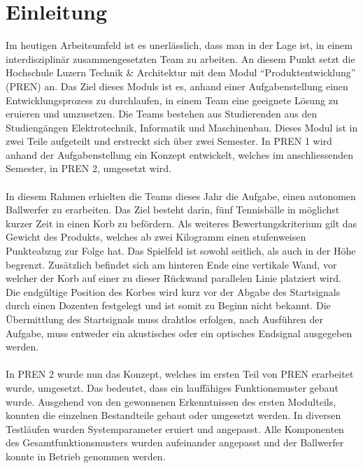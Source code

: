\section{Einleitung}
Im heutigen Arbeitsumfeld ist es unerlässlich, dass man in der Lage ist, in 
einem interdisziplinär zusammengesetzten Team zu arbeiten. An diesem Punkt 
setzt die Hochschule Luzern Technik \& Architektur mit dem Modul 
\enquote{Produktentwicklung} (PREN) an. Das Ziel dieses Moduls ist es, anhand 
einer Aufgabenstellung einen Entwicklungsprozess zu durchlaufen, in einem 
Team eine geeignete Lösung zu eruieren und umzusetzen. Die Teams bestehen 
aus Studierenden aus den Studiengängen Elektrotechnik, Informatik und 
Maschinenbau. Dieses Modul ist in zwei Teile aufgeteilt und erstreckt sich 
über zwei Semester. In PREN 1 wird anhand der Aufgabenstellung ein Konzept 
entwickelt, welches im anschliessenden Semester, in PREN 2, umgesetzt wird.\\
\\
In diesem Rahmen erhielten die Teams dieses Jahr die Aufgabe, einen autonomen 
Ballwerfer zu erarbeiten. Das Ziel besteht darin, fünf Tennisbälle in möglichst 
kurzer Zeit in einen Korb zu befördern. Als weiteres Bewertungskriterium gilt 
das Gewicht des Produkts, welches ab zwei Kilogramm einen stufenweisen 
Punkteabzug zur Folge hat. Das Spielfeld ist sowohl seitlich, als auch in der 
Höhe begrenzt. Zusätzlich befindet sich am hinteren Ende eine vertikale Wand, 
vor welcher der Korb auf einer zu dieser Rückwand parallelen Linie platziert 
wird. Die endgültige Position des Korbes wird kurz vor der Abgabe des Startsignals 
durch einen Dozenten festgelegt und ist somit zu Beginn nicht bekannt. Die 
Übermittlung des Startsignals muss drahtlos erfolgen, nach Ausführen der Aufgabe, 
muss entweder ein akustisches oder ein optisches Endsignal ausgegeben werden.\\
\\
In PREN 2 wurde nun das Konzept, welches im ersten Teil von PREN erarbeitet wurde, 
umgesetzt. Das bedeutet, dass ein lauffähiges Funktionsmuster gebaut wurde. 
Ausgehend von den gewonnenen Erkenntnissen des ersten Modulteils, konnten die 
einzelnen Bestandteile gebaut oder umgesetzt werden. In diversen Testläufen 
wurden Systemparameter eruiert und angepasst. Alle Komponenten des 
Gesamtfunktionsmusters wurden aufeinander angepasst und der Ballwerfer konnte in 
Betrieb genommen werden. 